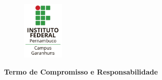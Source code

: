 \documentclass[12pt, a4paper]{article}
\begin{document}
\begin{figure}
  \centering
  \includegraphics[width=2cm]{logo-ifpe-garanhuns}
\end{figure}

\vspace{1cm}

\begin{center}
  \LARGE
  \textbf{Termo de Compromisso e Responsabilidade}
\end{center}

\vspace{0.5cm}
\end{document}
